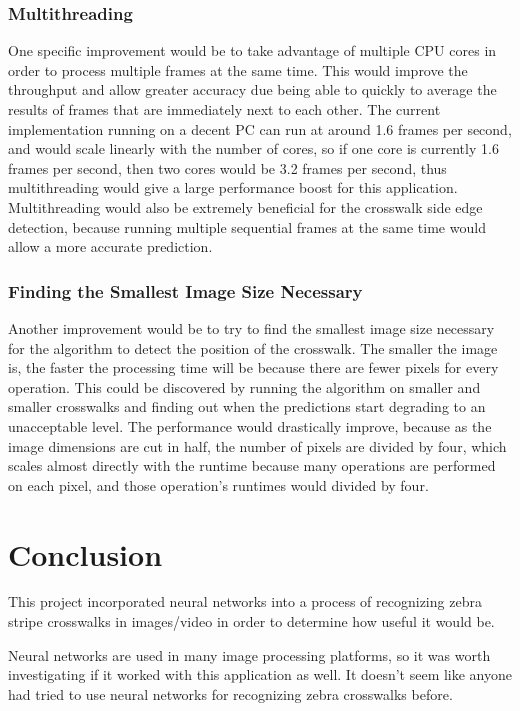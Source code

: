 \documentclass[12pt]{ucthesis}
\begin{document}
\subsection{Multithreading}
One specific improvement would be to take advantage of multiple CPU cores in order to process multiple frames at the same time. This would improve the throughput and allow greater accuracy due being able to quickly to average the results of frames that are immediately next to each other.
The current implementation running on a decent PC can run at around 1.6 frames per second, and would scale linearly with the number of cores, so if one core is currently 1.6 frames per second, then two cores would be 3.2 frames per second, thus multithreading would give a large performance boost for this application. Multithreading would also be extremely beneficial for the crosswalk side edge detection, because running multiple sequential frames at the same time would allow a more accurate prediction.

\subsection{Finding the Smallest Image Size Necessary}
Another improvement would be to try to find the smallest image size necessary for the algorithm to detect the position of the crosswalk. The smaller the image is, the faster the processing time will be because there are fewer pixels for every operation. This could be discovered by running the algorithm on smaller and smaller crosswalks and finding out when the predictions start degrading to an unacceptable level. The performance would drastically improve, because as the image dimensions are cut in half, the number of pixels are divided by four, which scales almost directly with the runtime because many operations are performed on each pixel, and those operation's runtimes would divided by four. 

\chapter{Conclusion}
\label{conclusion}

This project incorporated neural networks into a process of recognizing zebra stripe crosswalks in images/video in order to determine how useful it would be. 

Neural networks are used in many image processing platforms, so it was worth investigating if it worked with this application as well. It doesn't seem like anyone had tried to use neural networks for recognizing zebra crosswalks before.
\end{document}
